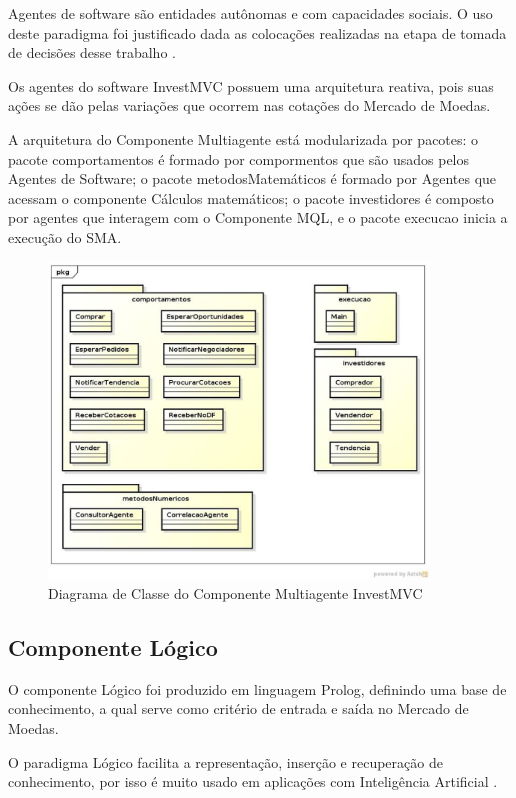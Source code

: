 Agentes de software são entidades autônomas e com capacidades sociais. O uso deste paradigma foi justificado dada as colocações realizadas na etapa de tomada de decisões desse trabalho \cite{agentBuilderWhy}. 

Os agentes do software  InvestMVC possuem uma arquitetura reativa, pois suas ações se dão pelas variações que ocorrem nas cotações do Mercado de Moedas.

A arquitetura do Componente Multiagente está modularizada por pacotes: o pacote comportamentos é formado por compormentos que são usados pelos Agentes de Software; o pacote metodosMatemáticos é formado por Agentes que acessam o componente Cálculos matemáticos; o pacote investidores é composto por agentes que interagem com o Componente MQL, e o pacote execucao inicia a execução do SMA.

\begin{figure}[H]
\centering
\includegraphics[width=0.9\textwidth]{figuras/diagramaClassesSMA}
\caption{Diagrama de Classe do Componente Multiagente InvestMVC} 
\label{diagramaClassesSMA}
\end{figure}

\subsection{Componente Lógico}

O componente Lógico foi produzido em linguagem Prolog, definindo uma base de conhecimento, a qual serve como critério de entrada e saída no Mercado de Moedas.

O paradigma Lógico facilita a representação, inserção e recuperação de conhecimento, por isso é muito usado em aplicações com Inteligência Artificial \cite{almeida2010}.

